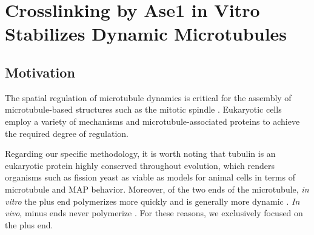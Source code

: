 \section{Crosslinking by Ase1 in Vitro Stabilizes Dynamic Microtubules}
\label{sec:Ase1}
\subsection{Motivation}
The spatial regulation of microtubule dynamics is critical for the assembly of microtubule-based structures such as the mitotic spindle \parencite{NEDELEC2003, Karsenti2008}. Eukaryotic cells employ a variety of mechanisms and microtubule-associated proteins to achieve the required degree of regulation.  \par Regarding our specific methodology, it is worth noting that tubulin is an eukaryotic protein highly conserved throughout evolution, which renders organisms such as fission yeast as viable as models for animal cells in terms of microtubule and MAP behavior. Moreover, of the two ends of the microtubule, \textit{in vitro} the plus end polymerizes more quickly and is generally more dynamic \parencite{Howard2003}. \textit{In vivo}, minus ends never polymerize \parencite{dammer}. For these reasons, we exclusively focused on the plus end.
 
 
